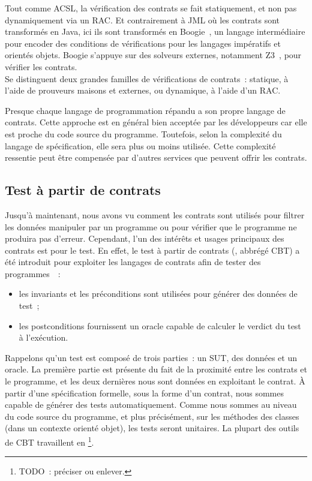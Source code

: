 Tout comme ACSL, la vérification des contrats se fait statiquement, et non pas
dynamiquement via un RAC. Et contrairement à JML où les contrats sont
transformés en Java, ici ils sont transformés en Boogie~,
un langage intermédiaire pour encoder des conditions de vérifications pour les
langages impératifs et orientés objets. Boogie s'appuye sur des solveurs
externes, notamment Z3~, pour vérifier les contrats. \\

Se distinguent deux grandes familles de vérifications de contrats~: statique, à
l'aide de prouveurs maisons et externes, ou dynamique, à l'aide d'un RAC.

Presque chaque langage de programmation répandu a son propre langage de
contrats. Cette approche est en général bien acceptée par les développeurs car
elle est proche du code source du programme. Toutefois, selon la complexité du
langage de spécification, elle sera plus ou moins utilisée. Cette complexité
ressentie peut être compensée par d'autres services que peuvent offrir les
contrats.

\subsection{Test à partir de contrats}
\label{subsection:sota:cbt}

Jusqu'à maintenant, nous avons vu comment les contrats sont utilisés pour
{\strong filtrer} les données manipuler par un programme ou pour vérifier que le
programme ne produira pas d'erreur. Cependant, l'un des intérêts et usages
principaux des contrats est pour le {\strong test}. En effet, le {\strong test à
partir de contrats} (, abbrégé CBT) a été
introduit pour exploiter les langages de contrats afin de tester des
programmes~~:

\begin{itemize}

\item les invariants et les préconditions sont utilisées pour {\strong générer
des données} de test~;

\item les postconditions {\strong fournissent un oracle} capable de calculer le
verdict du test à l'exécution.

\end{itemize}

Rappelons qu'un test est composé de trois parties~: un SUT, des données et un
oracle. La première partie est présente du fait de la proximité entre les
contrats et le programme, et les deux dernières nous sont données en exploitant
le contrat. À partir d'une spécification formelle, sous la forme d'un contrat,
nous sommes capable de générer des tests automatiquement. Comme nous sommes au
niveau du code source du programme, et plus précisément, sur les méthodes des
classes (dans un contexte orienté objet), les tests seront {\strong unitaires}.
La plupart des outils de CBT travaillent en
\footnote{TODO~: préciser ou enlever.}. \\

